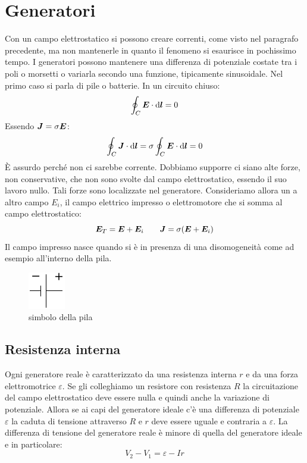 \section{Generatori}
Con un campo elettrostatico si possono creare correnti, come visto nel paragrafo precedente, ma non mantenerle in quanto il fenomeno si esaurisce in pochissimo tempo. I generatori possono mantenere una differenza di potenziale costate tra i poli o morsetti o variarla secondo una funzione, tipicamente sinusoidale. Nel primo caso si parla di pile o batterie. In un circuito chiuso:
\begin{equation*}\oint_C\boldsymbol{E}\cdot\mathrm{d}\boldsymbol{l}=0\end{equation*}
Essendo $\boldsymbol{J}=\sigma \boldsymbol{E}$:
\begin{equation*}\oint_C\boldsymbol{J}\cdot\mathrm{d}\boldsymbol{l}=\sigma\oint_C\boldsymbol{E}\cdot\mathrm{d}\boldsymbol{l}=0\end{equation*}
\`E assurdo perché non ci sarebbe corrente. Dobbiamo supporre ci siano alte forze, non conservative, che non sono svolte dal campo elettrostatico, essendo il suo lavoro nullo. Tali forze sono localizzate nel generatore. Consideriamo allora un a altro campo $E_i$, il campo elettrico impresso o elettromotore che si somma al campo elettrostatico:
\begin{equation*}\boldsymbol{E}_T=\boldsymbol{E}+\boldsymbol{E}_i\qquad \boldsymbol{J}=\sigma(\boldsymbol{E}+\boldsymbol{E}_i)\end{equation*}
Il campo impresso nasce quando si è in presenza di una disomogeneità  come ad esempio all'interno della pila.
\begin{figure}[htbp]
\centering
\includegraphics[scale=2]{immagini/fisica2/generatore}
\caption{simbolo della pila}
\end{figure}

\subsection{Resistenza interna}
Ogni generatore reale è caratterizzato da una resistenza interna $r$ e da una forza elettromotrice $\varepsilon$. Se gli colleghiamo un resistore con resistenza $R$ la circuitazione del campo elettrostatico deve essere nulla e quindi anche la variazione di potenziale. Allora se ai capi del generatore ideale c'è una differenza di potenziale $\varepsilon$ la caduta di tensione attraverso $R$ e $r$ deve essere uguale e contraria a $\varepsilon$. La differenza di tensione del generatore reale è minore di quella del generatore ideale e in particolare:
\begin{equation*}V_2-V_1=\varepsilon-Ir\end{equation*}

